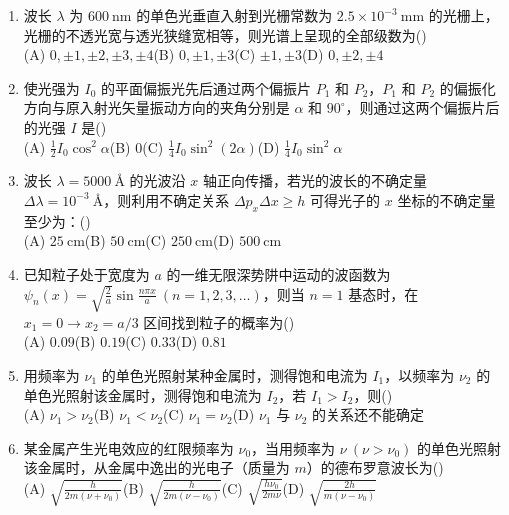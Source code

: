 \documentclass[zihao=5,a4paper,UTF8]{ctexart}
\newcommand{\choicebox}{\hfill(\hspace{1.8em})}
\begin{document}
\begin{enumerate}[leftmargin=2em, itemsep=6pt]
    \item 波长 $\lambda$ 为 $600\ \mathrm{nm}$ 的单色光垂直入射到光栅常数为 $2.5\times 10^{-3}\ \mathrm{mm}$ 的光栅上，光栅的不透光宽与透光狭缝宽相等，则光谱上呈现的全部级数为\choicebox\\
    (A) $0, \pm 1, \pm 2, \pm 3, \pm 4$\qquad (B) $0, \pm 1, \pm 3$\qquad (C) $\pm 1, \pm 3$\qquad (D) $0, \pm 2, \pm 4$

    \item 使光强为 $I_0$ 的平面偏振光先后通过两个偏振片 $P_1$ 和 $P_2$，$P_1$ 和 $P_2$ 的偏振化方向与原入射光矢量振动方向的夹角分别是 $\alpha$ 和 $90^\circ$，则通过这两个偏振片后的光强 $I$ 是\choicebox\\
    (A) $\frac{1}{2}I_0\cos^2\alpha$\qquad (B) $0$\qquad (C) $\frac{1}{4}I_0\sin^2(2\alpha)$\qquad (D) $\frac{1}{4}I_0\sin^2\alpha$

    \item 波长 $\lambda=5000\ \text{\AA}$ 的光波沿 $x$ 轴正向传播，若光的波长的不确定量 $\Delta\lambda = 10^{-3}\ \text{\AA}$，则利用不确定关系 $\Delta p_x \Delta x \ge h$ 可得光子的 $x$ 坐标的不确定量至少为：\choicebox\\
    (A) $25\ \mathrm{cm}$\qquad (B) $50\ \mathrm{cm}$\qquad (C) $250\ \mathrm{cm}$\qquad (D) $500\ \mathrm{cm}$

    \item 已知粒子处于宽度为 $a$ 的一维无限深势阱中运动的波函数为 $\psi_n(x) = \sqrt{\frac{2}{a}}\sin\frac{n\pi x}{a}\ (n=1,2,3,\dots)$，则当 $n=1$ 基态时，在 $x_1=0 \to x_2=a/3$ 区间找到粒子的概率为\choicebox\\
    (A) $0.09$\qquad (B) $0.19$\qquad (C) $0.33$\qquad (D) $0.81$

    \item 用频率为 $\nu_1$ 的单色光照射某种金属时，测得饱和电流为 $I_1$，以频率为 $\nu_2$ 的单色光照射该金属时，测得饱和电流为 $I_2$，若 $I_1 > I_2$，则\choicebox\\
    (A) $\nu_1 > \nu_2$\qquad (B) $\nu_1 < \nu_2$\qquad (C) $\nu_1 = \nu_2$\qquad (D) $\nu_1$ 与 $\nu_2$ 的关系还不能确定

    \item 某金属产生光电效应的红限频率为 $\nu_0$，当用频率为 $\nu\ (\nu > \nu_0)$ 的单色光照射该金属时，从金属中逸出的光电子（质量为 $m$）的德布罗意波长为\choicebox\\
    (A) $\sqrt{\frac{h}{2m(\nu+\nu_0)}}$\qquad (B) $\sqrt{\frac{h}{2m(\nu-\nu_0)}}$\qquad (C) $\sqrt{\frac{h\nu_0}{2m\nu}}$\qquad (D) $\sqrt{\frac{2h}{m(\nu-\nu_0)}}$
\end{enumerate}
\end{document}
